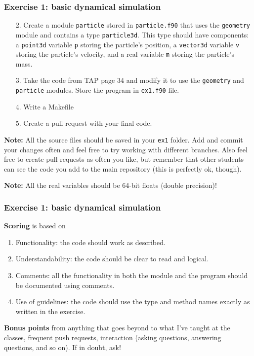 \begin{frame}
  \frametitle{Exercise 1: basic dynamical simulation}

  \begin{enumerate}
   \item[2.] Create a module \texttt{particle} stored in \texttt{particle.f90} that uses the \texttt{geometry} module and contains a type \texttt{particle3d}. This type should have components: a \texttt{point3d} variable \texttt{p} storing the particle's position, a \texttt{vector3d} variable \texttt{v} storing the particle's velocity, and a real variable \texttt{m} storing the particle's mass.
   \item[3.] Take the code from TAP page 34 and modify it to use the \texttt{geometry} and \texttt{particle} modules. Store the program in \texttt{ex1.f90} file.
   \item[4.] Write a Makefile
   \item[5.] Create a pull request with your final code.
  \end{enumerate}

  \vspace*{2mm}
  \textbf{Note:} All the source files should be saved in your \texttt{ex1} folder. Add and commit your changes often and feel free to try working with different branches. Also feel free to create pull requests as often you like, but remember that other students can see the code you add to the main repository (this is perfectly ok, though).

  \vspace*{2mm}
  \textbf{Note:} All the real variables should be 64-bit floats (double precision)! 
  \end{frame}

\begin{frame}
  \frametitle{Exercise 1: basic dynamical simulation}

  \textbf{Scoring} is based on
  \begin{enumerate}
  \item Functionality: the code should work as described.
  \item Understandability: the code should be clear to read and logical.
  \item Comments: all the functionality in both the module and the program should be documented using comments.
  \item Use of guidelines: the code should use the type and method names exactly as written in the exercise.
  \end{enumerate}

  \textbf{Bonus points} from anything that goes beyond to what I've taught at the classes, frequent push requests, interaction (asking questions, answering questions, and so on). If in doubt, ask!
  \end{frame}



